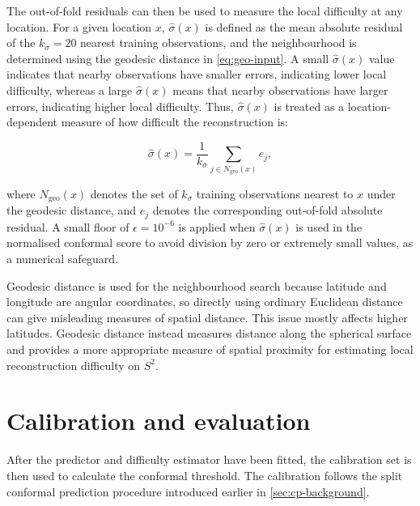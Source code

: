 \documentclass[11pt,a4paper]{report}
\begin{document}
The out-of-fold residuals can then be used to measure the local difficulty at any location. For a given location $x$, $\hat\sigma(x)$ is defined as the mean absolute residual of the $k_\sigma=20$ nearest training observations, and the neighbourhood is determined using the geodesic distance in \cref{eq:geo-input}. A small $\hat\sigma(x)$ value indicates that nearby observations have smaller errors, indicating lower local difficulty, whereas a large $\hat\sigma(x)$ means that nearby observations have larger errors, indicating higher local difficulty. Thus,  $\hat\sigma(x)$ is treated as a location-dependent measure of how difficult the reconstruction is:

\begin{equation}
\hat\sigma(x)
=
\frac{1}{k_\sigma}
\sum_{j\in N_{\mathrm{geo}}(x)} e_j,
\end{equation}

where $N_{\mathrm{geo}}(x)$ denotes the set of $k_\sigma$ training observations nearest to $x$ under the geodesic distance, and $e_j$ denotes the corresponding out-of-fold absolute residual. A small floor of $\epsilon=10^{-6}$ is applied when $\hat\sigma(x)$ is used in the normalised conformal score to avoid division by zero or extremely small values, as a numerical safeguard.

Geodesic distance is used for the neighbourhood search because latitude and longitude are angular coordinates, so directly using ordinary Euclidean distance can give misleading measures of spatial distance. This issue mostly affects higher latitudes. Geodesic distance instead measures distance along the spherical surface and provides a more appropriate measure of spatial proximity for estimating local reconstruction difficulty on $S^2$.

\section{Calibration and evaluation}
\label{sec:calibration_evaluation}

After the predictor and difficulty estimator have been fitted, the calibration set is then used to calculate the conformal threshold. The calibration follows the split conformal prediction procedure introduced earlier in \cref{sec:cp-background}.
\end{document}
